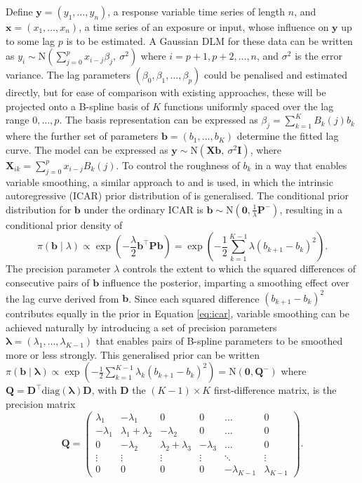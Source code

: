 \documentclass[11pt]{article}
\newcommand{\by}{\mathbf{y}}
\newcommand{\bx}{\mathbf{x}}
\newcommand{\bb}{\mathbf{b}}
\newcommand{\bX}{\mathbf{X}}
\newcommand{\bP}{\mathbf{P}}
\newcommand{\bQ}{\mathbf{Q}}
\newcommand{\bD}{\mathbf{D}}
\newcommand{\bI}{\mathbf{I}}
\newcommand{\blambda}{\bm{\lambda}}
\newcommand{\bzero}{\mathbf{0}}
\newcommand{\N}{\mathrm{N}}
\begin{document}
Define $\by = (y_1, \ldots, y_n)$, a response variable time series of length
$n$, and $\bx = (x_1, \ldots, x_n)$, a time series of an exposure or input,
whose influence on $\by$ up to some lag $p$ is to be estimated. A Gaussian DLM
for these data can be written as $y_i \sim \N\left(\sum_{j=0}^{p} x_{i-j}
\beta_j,\ \sigma^2\right)$ where $i = p+1, p+2, \ldots, n$, and $\sigma^2$ is
the error variance. The lag parameters $(\beta_0, \beta_1, \ldots, \beta_p)$
could be penalised and estimated directly, but for ease of comparison with
existing approaches, these will be projected onto a B-spline basis of $K$
functions uniformly spaced over the lag range $0, \ldots, p$. The basis
representation can be expressed as $\beta_j = \sum_{k=1}^{K} B_k(j) b_k$ where
the further set of parameters $\bb = (b_1, \ldots, b_K)$ determine the fitted
lag curve. The model can be expressed as $\by \sim \N(\bX \bb,\ \sigma^2
\bI)$, where $\bX_{ik} = \sum_{j=0}^{p} x_{i-j} B_k(j)$. To control the
roughness of $b_k$ in a way that enables variable smoothing, a similar
approach to \citet{brewer2007} and \citet{reich2008} is used, in which the
intrinsic autoregressive (ICAR) prior distribution of \citet{besag1991} is
generalised. The conditional prior distribution for $\bb$ under the ordinary
ICAR is $\bb \sim \N(\bzero, \frac{1}{\lambda} \bP^{-})$, resulting in a
conditional prior density of
\begin{equation}
\pi(\bb \mid \lambda) \propto \exp\left(-\frac{\lambda}{2} \bb^\top \bP \bb\right)
= \exp\left(-\frac{1}{2} \sum_{k=1}^{K-1} \lambda (b_{k+1} - b_k)^2\right).
\label{eq:icar}
\end{equation}
The precision parameter $\lambda$ controls the extent to which the squared
differences of consecutive pairs of $\bb$ influence the posterior, imparting a
smoothing effect over the lag curve derived from $\bb$. Since each squared
difference $(b_{k+1} - b_k)^2$ contributes equally in the prior in Equation
\eqref{eq:icar}, variable smoothing can be achieved naturally by introducing a
set of precision parameters $\blambda = (\lambda_1, \ldots, \lambda_{K-1})$
that enables pairs of B-spline parameters to be smoothed more or less
strongly. This generalised prior can be written $\pi(\bb \mid \blambda)
\propto \exp\left(-\frac{1}{2} \sum_{k=1}^{K-1} \lambda_k (b_{k+1} -
b_k)^2\right) = \N(\bzero, \bQ^{-})$ where $\bQ = \bD^\top \mathrm{diag}
(\blambda) \bD$, with $\bD$ the $(K-1) \times K$ first-difference matrix, is
the precision matrix
\begin{equation*}
\bQ =
\begin{pmatrix}
\lambda_1 & -\lambda_1 & 0 & 0 & \ldots & 0 \\
-\lambda_1 & \lambda_1 + \lambda_2 & -\lambda_2 & 0 & \ldots & 0 \\
0 & -\lambda_2 & \lambda_2 + \lambda_3 & -\lambda_3 & \ldots & 0 \\
\vdots & \vdots & \vdots & \vdots & \ddots & \vdots \\
0 & 0 & 0 & 0 & -\lambda_{K-1} & \lambda_{K-1}
\end{pmatrix}.
\end{equation*}
\end{document}
